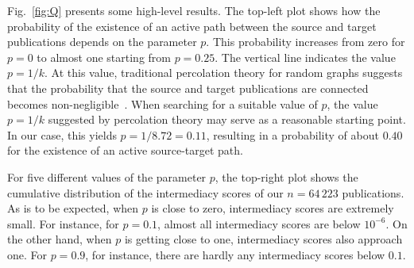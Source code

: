 \documentclass[9pt,twocolumn,twoside,lineno]{pnas-alt}
\theoremstyle{definition}
\newcommand{\figref}[1]{Fig.~\ref{fig:#1}\xspace}
\begin{document}
\figref{Q} presents some high-level results. The top-left plot shows how the probability of the existence of an active path between the source and target publications depends on the parameter $p$. This probability increases from zero for $p = 0$ to almost one starting from $p = 0.25$. The vertical line indicates the value $p = 1 / k$. At this value, traditional percolation theory for random graphs suggests that the probability that the source and target publications are connected becomes non-negligible~\cite{Newman2010}. When searching for a suitable value of $p$, the value $p = 1 / k$ suggested by percolation theory may serve as a reasonable starting point. In our case, this yields $p = 1 / 8.72 = 0.11$, resulting in a probability of about $0.40$ for the existence of an active source-target path.

For five different values of the parameter $p$, the top-right plot shows the cumulative distribution of the intermediacy scores of our $n = 64\,223$ publications. As is to be expected, when $p$ is close to zero, intermediacy scores are extremely small. For instance, for $p = 0.1$, almost all intermediacy scores are below $10^{-6}$. On the other hand, when $p$ is getting close to one, intermediacy scores also approach one. For $p = 0.9$, for instance, there are hardly any intermediacy scores below $0.1$.
\end{document}

